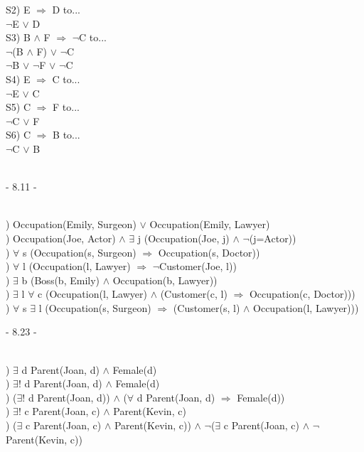 \documentclass[12pt]{article}
\begin{document}
\noindent S2) E $\Rightarrow$ D to...\\
\indent $\neg$E $\vee$ D\\[.4em]

\noindent S3) B $\wedge$ F $\Rightarrow$ $\neg$C to...\\
\indent $\neg$(B $\wedge$ F) $\vee$ $\neg$C\\
\indent $\neg$B $\vee$ $\neg$F $\vee$ $\neg$C\\[.4em]

\noindent S4) E $\Rightarrow$ C to...\\
\indent $\neg$E $\vee$ C\\[.4em]

\noindent S5) C $\Rightarrow$ F to...\\
\indent $\neg$C $\vee$ F\\[.4em]

\noindent S6) C $\Rightarrow$ B to...\\
\indent $\neg$C $\vee$ B\\[.4em]



\noindent \hrulefill \\



\centerline{- 8.11 - }
\ \\
) Occupation(Emily, Surgeon) $\vee$ Occupation(Emily, Lawyer)\\[.4em]
) Occupation(Joe, Actor) $\wedge$ $\exists$ j (Occupation(Joe, j) $\wedge$ $\neg$(j=Actor))\\[.4em]
) $\forall$ s (Occupation(s, Surgeon) $\Rightarrow$ Occupation(s, Doctor))\\[.4em]
) $\forall$ l (Occupation(l, Lawyer) $\Rightarrow$ $\neg$Customer(Joe, l))\\[.4em]
) $\exists$ b (Boss(b, Emily) $\wedge$ Occupation(b, Lawyer))\\[.4em]
) $\exists$ l $\forall$ c (Occupation(l, Lawyer) $\wedge$ (Customer(c, l) $\Rightarrow$ Occupation(c, Doctor)))\\[.4em]
) $\forall$ s $\exists$ l (Occupation(s, Surgeon) $\Rightarrow$ (Customer(s, l) $\wedge$ Occupation(l, Lawyer)))\\[.4em]



\noindent \hrulefill \pagebreak



\centerline{- 8.23 - }
\ \\
) $\exists$ d Parent(Joan, d) $\wedge$ Female(d)\\[.4em]
) $\exists$! d Parent(Joan, d) $\wedge$ Female(d)\\[.4em]
) ($\exists$! d Parent(Joan, d)) $\wedge$ ($\forall$ d Parent(Joan, d) $\Rightarrow$ Female(d))\\[.4em]
) $\exists$! c Parent(Joan, c) $\wedge$ Parent(Kevin, c)\\[.4em]
) ($\exists$ c Parent(Joan, c) $\wedge$ Parent(Kevin, c)) $\wedge$ $\neg$($\exists$ c Parent(Joan, c) $\wedge$ $\neg$Parent(Kevin, c))\\[.4em]
\end{document}

